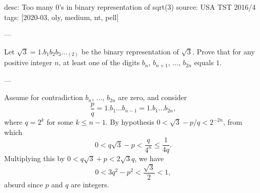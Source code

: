 desc: Too many 0's in binary representation of sqrt(3)
source: USA TST 2016/4
tags: [2020-03, oly, medium, nt, pell]

---

Let $\sqrt3=1.b_1b_2b_3\ldots_{(2)}$ be the binary representation of $\sqrt3$. Prove that for any positive integer $n$, at least one of the digits $b_n$, $b_{n+1}$, $\ldots$, $b_{2n}$ equals $1$.

---

Assume for contradiction $b_n$, $\ldots$, $b_{2n}$ are zero, and consider \[\frac pq=1.b_1\ldots b_{n-1}=1.b_1\ldots b_{2n},\]
where $q=2^k$ for some $k\le n-1$. By hypothesis $0<\sqrt3-p/q<2^{-2n}$,
from which \[0<q\sqrt3-p<\frac q{4^n}\le\frac1{4q}.\]
Multiplying this by $0<q\sqrt3+p<2\sqrt3q$, we have \[0<3q^2-p^2<\frac{\sqrt3}2<1,\]
absurd since $p$ and $q$ are integers.
